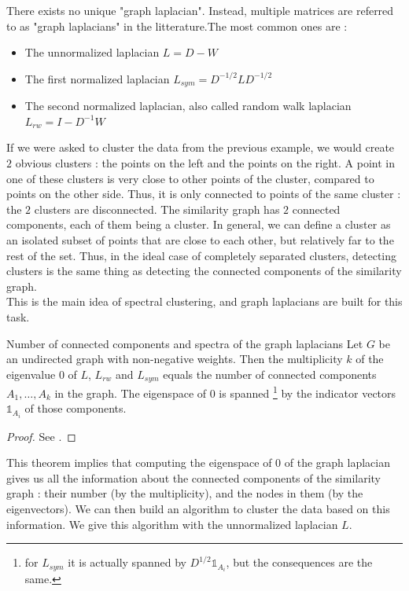 \documentclass[a4paper,12pt]{article}
\theoremstyle{definition}
\theoremstyle{plain}
\def\1char{\mathbb{1}}
\begin{document}
There exists no unique "graph laplacian". Instead, multiple matrices are referred to as "graph laplacians" in the litterature.The most common ones are :
\begin{itemize}
	\item The unnormalized laplacian $L = D - W$
	\item The first normalized laplacian $L_{sym}=D^{-1/2}LD^{-1/2}$
	\item The second normalized laplacian, also called random walk laplacian $L_{rw}= I - D^{-1}W$
\end{itemize}

If we were asked to cluster the data from the previous example, we would create $2$ obvious clusters : the points on the left and the points on the right. A point in one of these clusters is very close to other points of the cluster, compared to points on the other side. Thus, it is only connected to points of the same cluster : the $2$ clusters are disconnected.
The similarity graph has $2$ connected components, each of them being a cluster. 
In general, we can define a cluster as an isolated subset of points that are close to each other, but relatively far to the rest of the set. Thus, in the ideal case of completely separated clusters, detecting clusters is the same thing as detecting the connected components of the similarity graph. \\
This is the main idea of spectral clustering, and graph laplacians are built for this task.
\begin{theo*}{Number of connected components and spectra of the graph laplacians} \label{con_theo}
	Let $G$ be an undirected graph with
	non-negative weights. Then the multiplicity $k$ of the eigenvalue
	$0$ of $L$, $L_{rw}$ and $L_{sym}$ equals the number of connected
	components $A_1, \hdots, A_k$ in the graph. The eigenspace of $0$ is
	spanned \footnote{for $L_{sym}$ it is actually spanned by $D^{1/2} \1char_{A_i}$, but the consequences are the same.} by the indicator vectors $\1char_{A_i}$ of those
	components.
\end{theo*}

\begin{proof}
	See \cite{tutorial}.
\end{proof}
This theorem implies that computing the eigenspace of $0$ of the graph laplacian gives us all the information about the connected components of the similarity graph : their number (by the multiplicity), and the nodes in them (by the eigenvectors). We can then build an algorithm to cluster the data based on this information. We give this algorithm with the unnormalized laplacian $L$.
\end{document}
